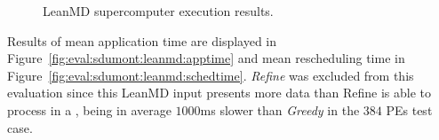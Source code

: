 \begin{figure}[!ht]
 \centering
 \caption{LeanMD supercomputer execution results.}
 \label{fig:eval:sdumont:leanmd}
\end{figure}



Results of mean application time are displayed in Figure~\ref{fig:eval:sdumont:leanmd:apptime} and mean rescheduling time in Figure~\ref{fig:eval:sdumont:leanmd:schedtime}.
\textit{Refine} was excluded from this evaluation since this LeanMD input presents more data than Refine is able to process in a , being in average $1000$ms slower than \textit{Greedy} in the $384$ PEs test case. %

